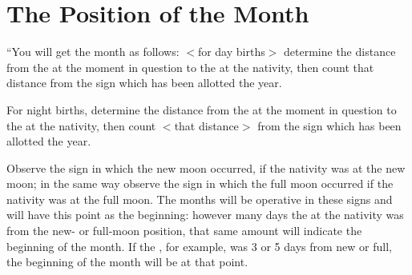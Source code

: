 \section{The Position of the Month}

“You will get the month as follows: $<$for day births$>$ determine the distance from the \Sun\xspace at the moment in question to the \Sun\xspace at the nativity, then count that distance from the sign which has been allotted the year. 

For night births, determine the distance from the \Moon\xspace at the moment in question to the \Moon\xspace at the nativity, then count $<$that distance$>$ from the sign which has been allotted the year. 

Observe the sign in which the new moon occurred, if the nativity was at the new moon; in the same way observe the sign in which the full moon occurred if the nativity was at the full moon. The months will be operative in these signs and will have this point as the beginning: however many days the \Moon\xspace at the nativity was from the new- or full-moon position, that same amount will indicate the beginning of the month. If the \Moon, for example, was 3 or 5 days from new or full, the beginning of the month will be at that point.

\newpage